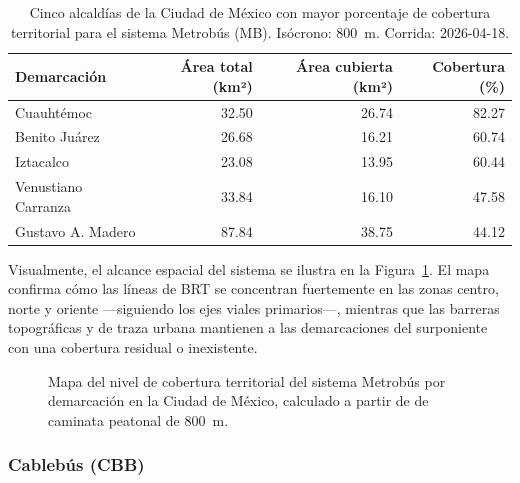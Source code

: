 \begin{table}[H]
    \centering
    \caption[Alcaldías con mayor cobertura de Metrobús (CDMX)]{
    Cinco alcaldías de la Ciudad de México con mayor porcentaje de cobertura
    territorial para el sistema Metrobús (MB). Isócrono: 800~m.
    Corrida: 2026-04-18.}
    \label{tab:cobertura-mb-cdmx}
    \begin{tabular}{|l|r|r|r|}
        \hline
        \textbf{Demarcación} & \textbf{Área total (km²)} & \textbf{Área cubierta (km²)} & \textbf{Cobertura (\%)} \\
        \hline
        Cuauhtémoc          & 32.50 &  26.74 &  82.27 \\
        Benito Juárez       & 26.68 &  16.21 &  60.74 \\
        Iztacalco           & 23.08 &  13.95 &  60.44 \\
        Venustiano Carranza & 33.84 &  16.10 &  47.58 \\
        Gustavo A. Madero   & 87.84 &  38.75 &  44.12 \\
        \hline
    \end{tabular}
\end{table}

Visualmente, el alcance espacial del sistema se ilustra en la
Figura~\ref{fig:mapa-cobertura-mb}. El mapa confirma cómo las líneas de BRT se
concentran fuertemente en las zonas centro, norte y oriente —siguiendo los ejes
viales primarios—, mientras que las barreras topográficas y de traza urbana
mantienen a las demarcaciones del surponiente con una cobertura residual o
inexistente.

\begin{figure}[H]
    \centering
    \caption[Mapa de cobertura territorial del Metrobús en la CDMX]{Mapa del
    nivel de cobertura territorial del sistema Metrobús por demarcación en la
    Ciudad de México, calculado a partir de  de caminata
    peatonal de 800~m.}
    \label{fig:mapa-cobertura-mb}
\end{figure}

\subsubsection{Cablebús (CBB)}
\label{subsubsec:cobertura-cbb}

